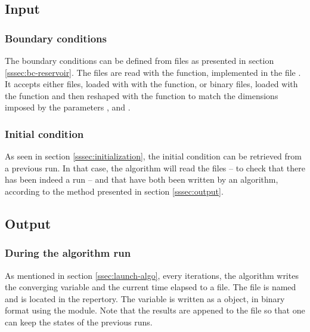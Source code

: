     \subsection{Input\label{sssec:input}}
    \noindent

        \subsubsection{Boundary conditions}
        \noindent

            The boundary conditions can be defined from files as presented in section \ref{sssec:bc-reservoir}. The files
            are read with the  function, implemented in the file .
            It accepts either  files, loaded with with the  function, or
            binary files, loaded with the  function and then reshaped with the
             function to match the dimensions imposed by the parameters
            ,  and .\\

        \subsubsection{Initial condition}
        \noindent

            As seen in section \ref{sssec:initialization}, the initial condition can be retrieved from a previous run.
            In that case, the algorithm will read the files  -- to check that there has been indeed
            a run -- and  that have both been written by an algorithm, according to the method
            presented in section \ref{sssec:output}.

    \subsection{Output\label{sssec:output}}
    \noindent

        \subsubsection{During the algorithm run}
        \noindent

            As mentioned in section \ref{ssec:launch-algo}, every  iterations, the algorithm writes
            the converging variable and the current time elapsed to a file.
            The file is named  and is located in the  repertory.
            The variable is written as a  object, in binary format using the \cpck{} module.
            Note that the results are appened to the file  so that one can keep the
            states of the previous runs.

